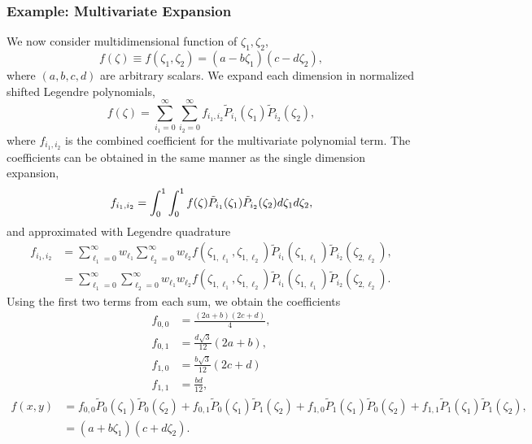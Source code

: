 \subsubsection{Example: Multivariate Expansion}
We now consider multidimensional function of $\zeta_1,\zeta_2$,
\begin{equation}
f(\zeta)\equiv f(\zeta_1,\zeta_2)=(a-b\zeta_1)(c-d\zeta_2),
\end{equation}
where $(a,b,c,d)$ are arbitrary scalars.  We expand each dimension in normalized shifted Legendre polynomials,
\begin{equation}
f(\zeta)=\sum_{i_1=0}^\infty \sum_{i_2=0}^\infty f_{i_1,i_2}\tilde P_{i_1}(\zeta_1)\tilde P_{i_2}(\zeta_2),
\end{equation}
where $f_{i_1,i_2}$ is the combined coefficient for the multivariate polynomial term.  The coefficients can be obtained in the same manner as the single dimension expansion,
\begin{equation}
f_{i_1,i_2}=\int_0^1\int_0^1 f(\zeta)\tilde P_{i_1}(\zeta_1)\tilde P_{i_2}(\zeta_2)d\zeta_1d\zeta_2,
\end{equation}
and approximated with Legendre quadrature
\begin{align}
f_{i_1,i_2}&=\sum_{\ell_1=0}^\infty w_{\ell_1} \sum_{\ell_2=0}^\infty w_{\ell_2}
     f(\zeta_{1,\ell_1},\zeta_{1,\ell_2})\tilde P_{i_1}(\zeta_{1,\ell_1})\tilde P_{i_2}(\zeta_{2,\ell_2}),\\
  &=\sum_{\ell_1=0}^\infty \sum_{\ell_2=0}^\infty w_{\ell_1}w_{\ell_2}
     f(\zeta_{1,\ell_1},\zeta_{1,\ell_2})\tilde P_{i_1}(\zeta_{1,\ell_1})\tilde P_{i_2}(\zeta_{2,\ell_2}).
\end{align}
Using the first two terms from each sum, we obtain the coefficients
\begin{align}
f_{0,0}&=\frac{(2a+b)(2c+d)}{4},\\
f_{0,1}&= \frac{d\sqrt{3}}{12}(2a+b), \\
f_{1,0}&=\frac{b\sqrt{3}}{12}(2c+d) \\
f_{1,1}&=\frac{bd}{12},
\end{align}
\begin{align}
f(x,y)&=f_{0,0}\tilde P_0(\zeta_1)\tilde P_0(\zeta_2) +
f_{0,1}\tilde P_0(\zeta_1)\tilde P_1(\zeta_2) +
f_{1,0}\tilde P_1(\zeta_1)\tilde P_0(\zeta_2) +
f_{1,1}\tilde P_1(\zeta_1)\tilde P_1(\zeta_2),\\
&=(a+b\zeta_1)(c+d\zeta_2).
\end{align}

